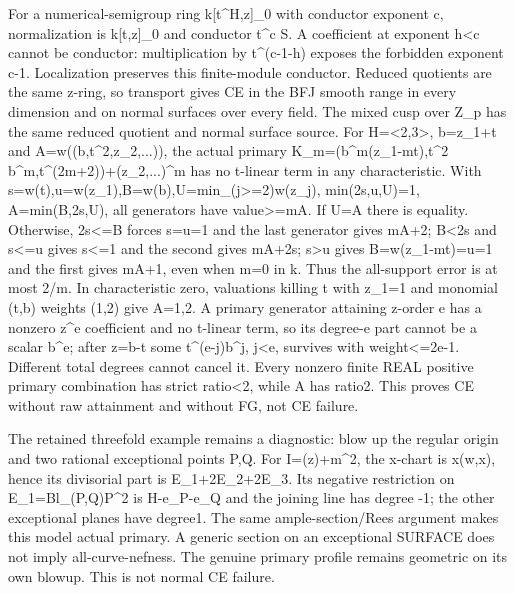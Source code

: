 For a numerical-semigroup ring k[t\textasciicircum{}H,z]\_0 with conductor exponent c, normalization is k[t,z]\_0 and conductor t\textasciicircum{}c S. A coefficient at exponent h\textless{}c cannot be conductor: multiplication by t\textasciicircum{}(c-1-h) exposes the forbidden exponent c-1. Localization preserves this finite-module conductor. Reduced quotients are the same z-ring, so transport gives CE in the BFJ smooth range in every dimension and on normal surfaces over every field. The mixed cusp over Z\_p has the same reduced quotient and normal surface source. For H=\textless{}2,3\textgreater{}, b=z\_1+t and A=w((b,t\textasciicircum{}2,z\_2,...)), the actual primary K\_m=(b\textasciicircum{}m(z\_1-mt),t\textasciicircum{}2 b\textasciicircum{}m,t\textasciicircum{}(2m+2))+(z\_2,...)\textasciicircum{}m has no t-linear term in any characteristic. With s=w(t),u=w(z\_1),B=w(b),U=min\_(j\textgreater{}=2)w(z\_j), min(2s,u,U)=1, A=min(B,2s,U), all generators have value\textgreater{}=mA. If U=A there is equality. Otherwise, 2s\textless{}=B forces s=u=1 and the last generator gives mA+2; B\textless{}2s and s\textless{}=u gives s\textless{}=1 and the second gives mA+2s; s\textgreater{}u gives B=w(z\_1-mt)=u=1 and the first gives mA+1, even when m=0 in k. Thus the all-support error is at most 2/m. In characteristic zero, valuations killing t with z\_1=1 and monomial (t,b) weights (1,2) give A=1,2. A primary generator attaining z-order e has a nonzero z\textasciicircum{}e coefficient and no t-linear term, so its degree-e part cannot be a scalar b\textasciicircum{}e; after z=b-t some t\textasciicircum{}(e-j)b\textasciicircum{}j, j\textless{}e, survives with weight\textless{}=2e-1. Different total degrees cannot cancel it. Every nonzero finite REAL positive primary combination has strict ratio\textless{}2, while A has ratio2. This proves CE without raw attainment and without FG, not CE failure.

The retained threefold example remains a diagnostic: blow up the regular origin and two rational exceptional points P,Q. For I=(z)+m\textasciicircum{}2, the x-chart is x(w,x), hence its divisorial part is E\_1+2E\_2+2E\_3. Its negative restriction on E\_1=Bl\_(P,Q)P\textasciicircum{}2 is H-e\_P-e\_Q and the joining line has degree -1; the other exceptional planes have degree1. The same ample-section/Rees argument makes this model actual primary. A generic section on an exceptional SURFACE does not imply all-curve-nefness. The genuine primary profile remains geometric on its own blowup. This is not normal CE failure.

